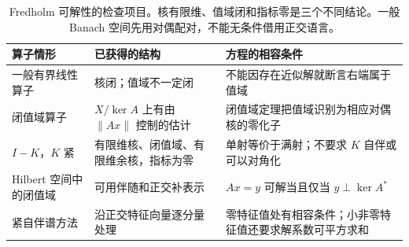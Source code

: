 \begin{table}[htbp]
\centering\small\renewcommand{\arraystretch}{1.18}\setlength{\tabcolsep}{4pt}
\caption[Fredholm 可解性的检查项目]{Fredholm 可解性的检查项目。核有限维、值域闭和指标零是三个不同结论。一般 Banach 空间先用对偶配对，不能无条件借用正交语言。}
\label{b1:tab:visual-t17}
\begin{tabularx}{\linewidth}{@{}>{\raggedright\arraybackslash}p{3.1cm}>{\raggedright\arraybackslash}p{4.7cm}>{\raggedright\arraybackslash}X@{}}
\toprule
算子情形 & 已获得的结构 & 方程的相容条件 \\
\midrule
一般有界线性算子 & 核闭；值域不一定闭 & 不能因存在近似解就断言右端属于值域 \\
闭值域算子 & \(X/\ker A\) 上有由 \(\|Ax\|\) 控制的估计 & 闭值域定理把值域识别为相应对偶核的零化子 \\
\(I-K\)，\(K\) 紧 & 有限维核、闭值域、有限维余核，指标为零 & 单射等价于满射；不要求 \(K\) 自伴或可以对角化 \\
Hilbert 空间中的闭值域 & 可用伴随和正交补表示 & \(Ax=y\) 可解当且仅当 \(y\perp\ker A^*\) \\
紧自伴谱方法 & 沿正交特征向量逐分量处理 & 零特征值处有相容条件；小非零特征值还要求解系数可平方求和 \\
\bottomrule
\end{tabularx}
\end{table}
